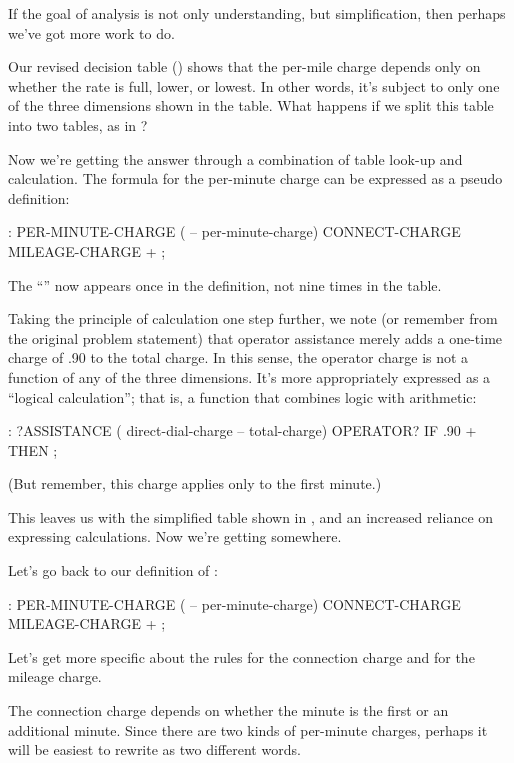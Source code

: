 \noindent If the goal of analysis is not only understanding, but
simplification, then perhaps we've got more work to do.

Our revised decision table () shows that the per-mile
charge depends only on whether the rate is full, lower, or lowest. In
other words, it's subject to only one of the three dimensions shown in
the table.  What happens if we split this table into two tables, as in
?


Now we're getting the answer through a combination of table look-up
and calculation. The formula for the per-minute charge can be
expressed as a pseudo\Forth{} definition:

\begin{Code}
: PER-MINUTE-CHARGE ( -- per-minute-charge)
        CONNECT-CHARGE  MILEAGE-CHARGE  + ;
\end{Code}
The ``\forth{+}'' now appears once in the definition,
not nine times in the table.

Taking the principle of calculation one step further, we note (or
remember from the original problem statement) that operator assistance
merely adds a one-time charge of .90 to the total charge. In this
sense, the operator charge is not a function of any of the three
dimensions. It's more
appropriately expressed as a ``logical calculation''; that is, a
function that combines logic with arithmetic:

\begin{Code}
: ?ASSISTANCE
   ( direct-dial-charge -- total-charge)
   OPERATOR? IF .90 + THEN ;
\end{Code}
(But remember, this charge applies only to the first minute.)


This leaves us with the simplified table shown in , and an
increased reliance on expressing calculations. Now we're getting
somewhere.

Let's go back to our definition of :
\begin{Code}
: PER-MINUTE-CHARGE ( -- per-minute-charge)
   CONNECT-CHARGE  MILEAGE-CHARGE  + ;
\end{Code}
Let's get more specific about the rules for the connection charge and for
the mileage charge.

The connection charge depends on whether the minute is the first or
an additional minute. Since there are two kinds of per-minute charges,
perhaps it will be easiest to rewrite  as two
different words.

